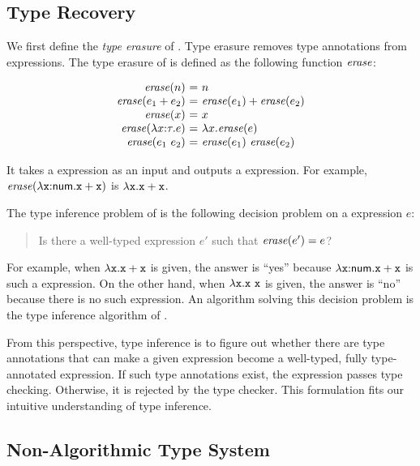 \subsection{Type Recovery}

\newcommand{\ersr}[1]{\embox{erase}(#1)}

We first define the \textit{type erasure} of \plang. Type
erasure removes type annotations from expressions. The type erasure of \plang is
defined as the following function $\mbox{\emph{erase}}$:

\[
  \begin{array}{r@{~}c@{~}l}
    \ersr{n} &=& n \\
    \ersr{\eadd{e_1}{e_2}} &=& \eadd{\ersr{e_1}}{\ersr{e_2}} \\
    \ersr{x} &=& x \\
    \ersr{\efunt{x}{\tau}{e}} &=& \efun{x}{\ersr{e}} \\
    \ersr{\eapp{e_1}{e_2}} &=& \eapp{\ersr{e_1}}{\ersr{e_2}} \\
  \end{array}
\]

It takes a \plang expression as an input and outputs a \Lang expression.
For example, $\ersr{\efunt{\cx}{\tnum}{\eadd{\cx}{\cx}}}$ is
$\lambda\texttt{x}.\texttt{x}+\texttt{x}$.

The type inference problem of \Lang is the following decision problem on a \Lang
expression $e$:

\begin{quote}
  \hspace{-1em}Is there a well-typed \plang expression $e'$ such that $\ersr{e'}=e$?
\end{quote}

For example, when $\lambda\texttt{x}.\texttt{x}+\texttt{x}$ is given, the answer is ``yes''
because $\lambda\texttt{x}{:}\textsf{num}.\texttt{x}+\texttt{x}$ is such a \plang expression. On
the other hand, when $\lambda\texttt{x}.\texttt{x}\ \texttt{x}$ is given, the answer is
``no'' because there is no such expression. An algorithm solving this decision
problem is the type inference algorithm of \Lang.

From this perspective, type inference is to figure out whether there are type
annotations that can make a given expression become a well-typed, fully
type-annotated expression. If such type annotations exist, the expression passes
type checking. Otherwise, it is rejected by the type checker. This formulation
fits our intuitive understanding of type inference.

\subsection{Non-Algorithmic Type System}

